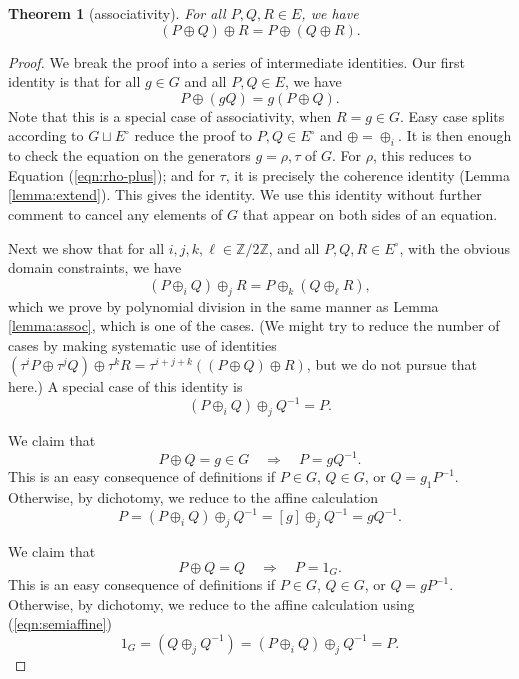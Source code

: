 \documentclass[12pt]{article}
\newtheorem{theorem}{Theorem}[subsection]
\newcommand{\ring}[1]{\mathbb{#1}}
\newcommand{\Eoo}{E^{\circ}}
\newcommand{\hplus}{\oplus}
\begin{document}
\begin{theorem}[associativity]\label{lemma:pseudo} 
  For all $P,Q,R\in E$, we have
\[
(P\hplus Q)\hplus R = P \hplus (Q\hplus R).
\]
\end{theorem}

\begin{proof}  
  We break the proof into a series of intermediate identities.  Our
  first identity is that for all $g\in G$ and all $P,Q\in E$, we have
\[
P\hplus (g Q) = g (P\hplus Q).
\]
Note that this is a special case of associativity, when $R=g\in G$.  
Easy case splits according to $G\sqcup
\Eoo$ reduce the proof to $P,Q\in \Eoo$ and $\hplus =\oplus_i$.  It is
then enough to check the equation on the generators $g=\rho,\tau$ of
$G$.  For $\rho$, this reduces to Equation (\ref{eqn:rho-plus}); and
for $\tau$, it is precisely the coherence identity (Lemma
\ref{lemma:extend}).  This gives the identity.  We use this
identity without further comment to cancel any elements of $G$ that
appear on both sides of an equation.

Next we show that for all $i,j,k,\ell\in \ring{Z}/2\ring{Z}$, and all
$P,Q,R\in \Eoo$, with the obvious domain constraints, we have
\begin{equation}\label{eqn:assoc-affine}
(P\oplus_i Q) \oplus_j R = P \oplus_k (Q \oplus_\ell R),
\end{equation}
which we prove by polynomial division in the same manner as
Lemma \ref{lemma:assoc}, which is one of the cases.  (We might try to
reduce the number of cases by making systematic use of identities
$(\tau^i P\oplus\tau^j Q)\oplus \tau^k R = \tau^{i+j+k} ((P\oplus
Q)\oplus R)$, but we do not pursue that here.) A special case of this
identity is
\begin{equation}\label{eqn:semiaffine}
(P\oplus_i Q) \oplus_j Q^{-1} = P.
\end{equation}

We claim that 
\begin{equation}\label{eqn:g-cancel}
P\oplus Q = g\in G\quad\Rightarrow\quad P = g Q^{-1}.
\end{equation}
This is an easy consequence of definitions if $P\in G$, $Q\in G$, or
$Q = g_1 P^{-1}$.  Otherwise, by dichotomy, we reduce to the affine
calculation
\[
P = (P\oplus_i Q)\oplus_j Q^{-1} = [g]\oplus_j Q^{-1} = g Q^{-1}.
\]

We claim that
\begin{equation}\label{eqn:cancel}
P \oplus Q = Q \quad \Rightarrow\quad P = 1_G.
\end{equation}
This is an easy consequence of definitions if $P\in G$, $Q\in G$, or
$Q = gP^{-1}$.  Otherwise, by dichotomy, we reduce to the affine
calculation using (\ref{eqn:semiaffine})
\[
1_G = (Q \oplus_j Q^{-1}) = (P\oplus_i Q)\oplus_j Q^{-1} = P.
\]


\end{proof}
\end{document}
